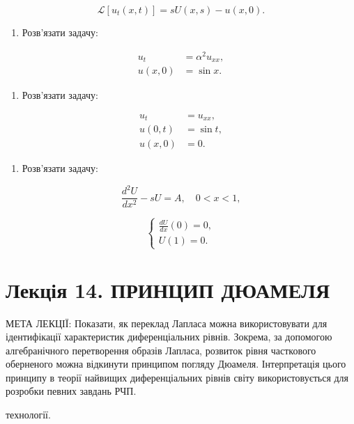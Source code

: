 \documentclass[
  ukrainian,
]{article}
\providecommand{\tightlist}{%
  \setlength{\itemsep}{0pt}\setlength{\parskip}{0pt}}
\begin{document}
\[
\mathscr{L}[u_t(x,t)] = sU(x,s) - u(x,0).
\]

\begin{enumerate}
\def\labelenumi{\arabic{enumi}.}
\setcounter{enumi}{1}
\tightlist
\item
  Розв'язати задачу:
\end{enumerate}

\[
\begin{aligned}
u_t &= \alpha^2 u_{xx}, \\
u(x,0) &= \sin x.
\end{aligned}
\]

\begin{enumerate}
\def\labelenumi{\arabic{enumi}.}
\setcounter{enumi}{2}
\tightlist
\item
  Розв'язати задачу:
\end{enumerate}

\[
\begin{aligned}
u_t &= u_{xx}, \\
u(0,t) &= \sin t, \\
u(x,0) &= 0.
\end{aligned}
\]

\begin{enumerate}
\def\labelenumi{\arabic{enumi}.}
\setcounter{enumi}{3}
\tightlist
\item
  Розв'язати задачу:
\end{enumerate}

\[
\frac{d^2U}{dx^2} - sU = A, \quad 0 < x < 1,
\]

\[
\begin{cases}
\frac{dU}{dx}(0) = 0, \\
U(1) = 0.
\end{cases}
\]

\section{Лекція 14. ПРИНЦИП
ДЮАМЕЛЯ}\label{ux43bux435ux43aux446ux456ux44f-14.-ux43fux440ux438ux43dux446ux438ux43f-ux434ux44eux430ux43cux435ux43bux44f}

МЕТА ЛЕКЦІЇ: Показати, як переклад Лапласа можна використовувати для
ідентифікації характеристик диференціальних рівнів. Зокрема, за
допомогою алгебранічного перетворення образів Лапласа, розвиток рівня
часткового оберненого можна відкинути принципом погляду Дюамеля.
Інтерпретація цього принципу в теорії найвищих диференціальних рівнів
світу використовується для розробки певних завдань РЧП.

технології.
\end{document}
